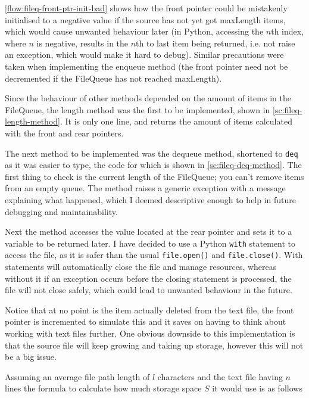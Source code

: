 \documentclass[11pt]{article}
\begin{document}
            \autoref{flow:fileq-front-ptr-init-bad} shows how the front pointer could be mistakenly initialised to a negative value if the source has not yet got maxLength items, which would cause unwanted behaviour later (in Python, accessing the $n$th index, where $n$ is negative, results in the $n$th to last item being returned, i.e. not raise an exception, which would make it hard to debug). Similar precautions were taken when implementing the enqueue method (the front pointer need not be decremented if the FileQueue has not reached maxLength).

            \vspace{10pt}
            Since the behaviour of other methods depended on the amount of items in the FileQueue, the length method was the first to be implemented, shown in \autoref{sc:fileq-length-method}. It is only one line, and returns the amount of items calculated with the front and rear pointers. 

            \vspace{10pt}
            The next method to be implemented was the dequeue method, shortened to \verb|deq| as it was easier to type, the code for which is shown in \autoref{sc:fileq-deq-method}. The first thing to check is the current length of the FileQueue; you can't remove items from an empty queue. The method raises a generic exception with a message explaining what happened, which I deemed descriptive enough to help in future debugging and maintainability.

            Next the method accesses the value located at the rear pointer and sets it to a variable to be returned later. I have decided to use a Python \verb|with| statement to access the file, as it is safer than the usual \verb|file.open()| and \verb|file.close()|. With statements will automatically close the file and manage resources, whereas without it if an exception occurs before the closing statement is processed, the file will not close safely, which could lead to unwanted behaviour in the future. 

            \vspace{10pt}
            Notice that at no point is the item actually deleted from the text file, the front pointer is incremented to simulate this and it saves on having to think about working with text files further. One obvious downside to this implementation is that the source file will keep growing and taking up storage, however this will not be a big issue. 

            Assuming an average file path length of $l$ characters and the text file having $n$ lines the formula to calculate how much storage space $S$ it would use is as follows
\end{document}
